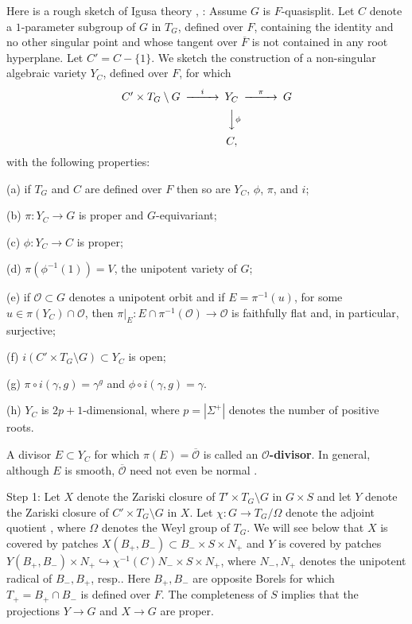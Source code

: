 \documentclass[12pt,letterpaper]{amsart}
\newcommand{\ovF}{\overline{F}}
\newcommand{\ooo}{\mathcal{O}}
\newcommand{\ovo}{\overline{\mathcal{O}}}
\begin{document}
Here is a rough sketch of Igusa theory \cite{La83}, \cite{Ha92a}:
Assume $G$ is $F$-quasisplit. Let $C$ denote a $1$-parameter subgroup of $G$
in $T_G$, defined over $F$, containing the identity
and no other singular point and whose tangent over $\ovF$ is not
contained in any root hyperplane. Let $C'=C-\{1\}$. We sketch the
construction of a non-singular algebraic variety $Y_C$, defined over $F$,
for which
\[
\begin{CD}
C'\times T_G\setminus G @> i >> Y_C @> \pi >> G\\
@. @VV \phi V @. \\
@. C, @.
\end{CD}
\]
with the following properties:

\noindent
(a) if $T_G$ and $C$ are defined over $F$ then so are
$Y_C$, $\phi$, $\pi$, and $i$;

\noindent
(b) $\pi : Y_C\rightarrow G$ is proper and $G$-equivariant;

\noindent
(c) $\phi : Y_C\rightarrow C$ is proper;

\noindent
(d) $\pi(\phi^{-1}(1))=V$, the unipotent variety of $G$;

\noindent
(e) if ${\mathcal O}\subset G$ denotes a
unipotent orbit and if $E=\pi^{-1}(u)$,
for some $u\in \pi(Y_C)\cap {\mathcal O}$,
then $\pi|_{E}:E\cap \pi^{-1}({\mathcal O})\rightarrow {\mathcal O}$
is faithfully flat
\cite[Ch II, Proposition 3.1]{DG80} and, in particular, surjective;

\noindent
(f) $i(C'\times T_G\setminus G
)\subset Y_C$ is open;

\noindent
(g) $\pi\circ i(\gamma,g)=\gamma^g$ and $\phi\circ i(\gamma,g)=\gamma$.

\noindent
(h)  $Y_C$ is $2p+1$-dimensional, where $p=|\Sigma^+|$
denotes the number of positive roots.

\noindent
A divisor $E\subset Y_C$ for which $\pi(E)=\ovo$ is called an
\textbf{$\ooo$-divisor}. In general, although $E$ is smooth,
$\ovo$ need not even be normal \cite[\S 0]{KP79}.

\noindent
Step 1: Let $X$ denote the Zariski closure of $T'\times T_G\setminus G$
in $G\times S$ and let $Y$ denote the Zariski closure of
$C'\times T_G\setminus G$
in $X$. Let $\chi :G\rightarrow T_G/\Omega$ denote the adjoint
quotient \cite{Sl80}, where $\Omega$ denotes the Weyl group of $T_G$.
We will see below that $X$ is covered by patches
$X(B_+ ,B_{-})\subset
B_{-}\times S\times N_+$ and $Y$ is covered by patches
$Y(B_+ ,B_-)\times N_+\hookrightarrow \chi^{-1}(C) N_-\times S\times N_+$,
where $N_-,N_+$ denotes the unipotent radical of $B_-,B_+$, resp..
Here $B_+,B_-$ are opposite Borels for which
$T_+=B_+\cap B_-$ is defined over $F$. The completeness
of $S$ implies that the projections $Y\rightarrow G$
and $X\rightarrow G$ are proper.
\end{document}
